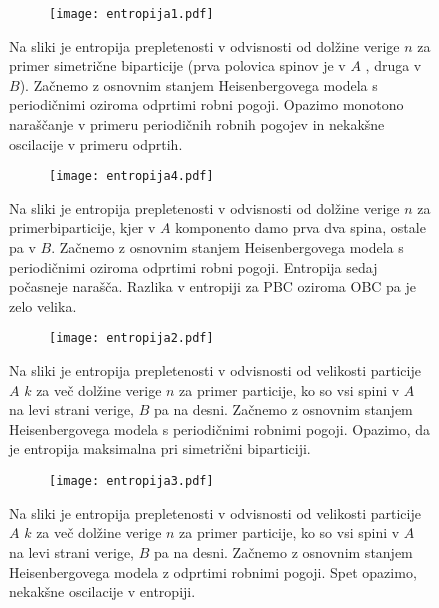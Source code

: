 \documentclass{article}
\begin{document}
\begin{figure}[H]
\centering
\begin{subfigure}{.7\textwidth}
\texttt{[image: entropija1.pdf]}
\end{subfigure}
\caption*{Na sliki je entropija prepletenosti v odvisnosti od dolžine verige $n$ za primer simetrične biparticije (prva polovica spinov je v $A$ , druga v $B$). Začnemo z osnovnim stanjem Heisenbergovega modela s periodičnimi oziroma odprtimi robni pogoji. Opazimo monotono naraščanje v primeru periodičnih robnih pogojev in nekakšne oscilacije v primeru odprtih.}
\end{figure}

\begin{figure}[H]
\centering
\begin{subfigure}{.7\textwidth}
\texttt{[image: entropija4.pdf]}
\end{subfigure}
\caption*{Na sliki je entropija prepletenosti v odvisnosti od dolžine verige $n$ za primerbiparticije, kjer v $A$ komponento damo prva dva spina, ostale pa v $B$. Začnemo z osnovnim stanjem Heisenbergovega modela s periodičnimi oziroma odprtimi robni pogoji. Entropija sedaj počasneje narašča. Razlika v entropiji za PBC oziroma OBC pa je zelo velika.}
\end{figure}

\begin{figure}[H]
\centering
\begin{subfigure}{.7\textwidth}
\texttt{[image: entropija2.pdf]}
\end{subfigure}
\caption*{Na sliki je entropija prepletenosti v odvisnosti od velikosti particije $A$ $k$ za več dolžine verige $n$ za primer particije, ko so vsi spini v $A$ na levi strani verige, $B$ pa na desni. Začnemo z osnovnim stanjem Heisenbergovega modela s periodičnimi robnimi pogoji. Opazimo, da je entropija maksimalna pri simetrični biparticiji.}
\end{figure}

\begin{figure}[H]
\centering
\begin{subfigure}{.7\textwidth}
\texttt{[image: entropija3.pdf]}
\end{subfigure}
\caption*{Na sliki je entropija prepletenosti v odvisnosti od velikosti particije $A$ $k$ za več dolžine verige $n$ za primer particije, ko so vsi spini v $A$ na levi strani verige, $B$ pa na desni. Začnemo z osnovnim stanjem Heisenbergovega modela z odprtimi robnimi pogoji. Spet opazimo, nekakšne oscilacije v entropiji.}
\end{figure}
\end{document}
